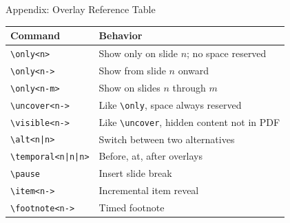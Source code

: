 \documentclass[
  doctype=beamer,
  beameraspectratio=169,
  beamertheme=Madrid,
  institution=generic,
]{omnilatex}
\begin{document}
\begin{frame}{Appendix: Overlay Reference Table}
  \begin{table}
    \centering
    \small
    \begin{tabular}{l l}
      \hline
      Command & Behavior \\
      \hline
      \texttt{\textbackslash only<n>{}} & Show only on slide $n$; no space reserved \\
      \texttt{\textbackslash only<n->{}} & Show from slide $n$ onward \\
      \texttt{\textbackslash only<n-m>{}} & Show on slides $n$ through $m$ \\
      \texttt{\textbackslash uncover<n->{}} & Like \texttt{\textbackslash only}, space always reserved \\
      \texttt{\textbackslash visible<n->{}} & Like \texttt{\textbackslash uncover}, hidden content not in PDF \\
      \texttt{\textbackslash alt<n|n>{}} & Switch between two alternatives \\
      \texttt{\textbackslash temporal<n|n|n>{}} & Before, at, after overlays \\
      \texttt{\textbackslash pause} & Insert slide break \\
      \texttt{\textbackslash item<n->} & Incremental item reveal \\
      \texttt{\textbackslash footnote<n->{}} & Timed footnote \\
      \hline
    \end{tabular}
  \end{table}
\end{frame}
\end{document}
